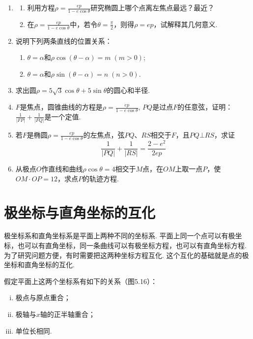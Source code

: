 \begin{enumerate}
\item \begin{enumerate}[(1)]
    \item 利用方程$\rho=\frac{ep}{1-e\cos\theta}$研究椭圆上哪个点离左焦点最远？最近？
    \item 在$\rho=\frac{ep}{1-e\cos\theta}$中，若令$\theta=\frac{\pi}{2}$，则得$\rho=ep$，试解释其几何意义.
\end{enumerate}
\item  说明下列两条直线的位置关系：
\begin{enumerate}[(1)]
    \item $\theta=\alpha$和$\rho\cos(\theta-\alpha)=m\; (m>0)$;
    \item $\theta=\alpha$和$\rho\sin(\theta-\alpha)=n\; (n>0)$.
\end{enumerate}

\item  求出圆$\rho=5\sqrt{3}\cos\theta+5\sin\theta$的圆心和半径.
\item  $F$是焦点，圆锥曲线的方程是$\rho=\frac{ep}{1-e\cos\theta}$, $PQ$是过点$F$的任意弦，证明：
$\frac{1}{|FP|}+\frac{1}{|FQ|}$是一个定值.
\item  若$F$是椭圆$\rho=\frac{ep}{1-e\cos\theta}$的左焦点，弦$PQ$、$RS$相交于$F$，且$PQ\bot RS$，求证
\[\frac{1}{|PQ|}+\frac{1}{|RS|}=\frac{2-e^2}{2ep}\]
\item  从极点$O$作直线和曲线$\rho\cos\theta=4$相交于$M$点，在$OM$上取一点$P$，使$OM\cdot OP=12$，求点$P$的轨迹方程.
\end{enumerate}

\section{极坐标与直角坐标的互化}
极坐标系和直角坐标系是平面上两种不同的坐标系. 平面上同一个点可以有极坐标，也可以有直角坐标，同一条曲线可以有极坐标方程，也可以有直角坐标方程. 为了研究问题方便，有时需要把这两种坐标方程互化. 这个互化的基础就是点的极坐标和直角坐标的互化.

假定平面上这两个坐标系有如下的关系（图5.16）：
\begin{enumerate}[(i)]
    \item 极点与原点重合；
    \item 极轴与$x$轴的正半轴重合；
    \item 单位长相同.
\end{enumerate}

